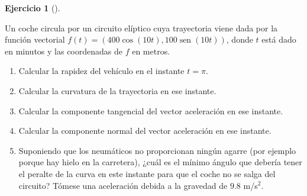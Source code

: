 \documentclass[
  spanish,
  a4paper,
]{scrreport}
\theoremstyle{definition}
\newtheorem{exercise}{Ejercicio}[chapter]
\theoremstyle{remark}
\begin{document}
\begin{exercise}[]\protect\hypertarget{exr-2}{}\label{exr-2}

Un coche circula por un circuito elíptico cuya trayectoria viene dada
por la función vectorial
\(f(t)=(400\cos(10t), 100\operatorname{sen}(10t))\), donde \(t\) está
dado en minutos y las coordenadas de \(f\) en metros.

\begin{enumerate}
\def\labelenumi{\alph{enumi}.}
\item
  Calcular la rapidez del vehículo en el instante \(t=\pi\).
\item
  Calcular la curvatura de la trayectoria en ese instante.
\item
  Calcular la componente tangencial del vector aceleración en ese
  instante.
\item
  Calcular la componente normal del vector aceleración en ese instante.
\item
  Suponiendo que los neumáticos no proporcionan ningún agarre (por
  ejemplo porque hay hielo en la carretera), ¿cuál es el mínimo ángulo
  que debería tener el peralte de la curva en este instante para que el
  coche no se salga del circuito? Tómese una aceleración debida a la
  gravedad de \(9.8\) m/s\(^2\).
\end{enumerate}

\end{exercise}
\end{document}
